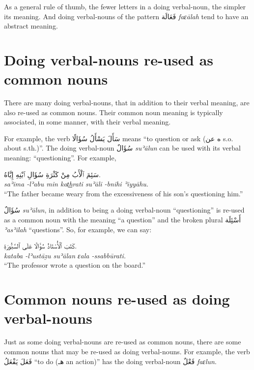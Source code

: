 \documentclass[
  10pt,
]{book}
\begin{document}
As a general rule of thumb, the fewer letters in a doing verbal-noun, the simpler its meaning. And doing verbal-nouns of the pattern \foreignlanguage{arabic}{فَعَالَة} \emph{faɛālah} tend to have an abstract meaning.

\section{Doing verbal-nouns re-used as common nouns}\label{doing-verbal-nouns-re-used-as-common-nouns}

There are many doing verbal-nouns, that in addition to their verbal meaning, are also re-used as common nouns. Their common noun meaning is typically associated, in some manner, with their verbal meaning.

For example, the verb \foreignlanguage{arabic}{سَأَلَ يَسْأَلُ سُؤَالًا} means \enquote{to question or ask (\foreignlanguage{arabic}{ه عن} s.o. about s.th.)}. The doing verbal-noun \foreignlanguage{arabic}{سُؤَالٌ} \emph{suʾālun} can be used with its verbal meaning: \enquote{questioning}. For example,

\foreignlanguage{arabic}{سَئِمَ ٱلْأَبُ مِنْ کَثْرَةِ سُؤَالِ ٱبْنِهِ إِيَّاهُ.}\\
\emph{saʾima -lʾabu min kat͟hrati suʾāli -bnihi ʾiyyāhu.}\\
\enquote{The father became weary from the excessiveness of his son's questioning him.}

\foreignlanguage{arabic}{سُؤَالٌ} \emph{suʾālun}, in addition to being a doing verbal-noun \enquote{questioning} is re-used as a common noun with the meaning \enquote{a question} and the broken plural \foreignlanguage{arabic}{أَسْئِلَة} \emph{ʾasʾilah} \enquote{questions}. So, for example, we can say:

\foreignlanguage{arabic}{کَتَبَ ٱلْأُسْتَاذُ سُؤَالًا عَلَى ٱلسَّبُّورَةِ.}\\
\emph{kataba -lʾustāẕu suʾālan ɛala -ssabbūrati.}\\
\enquote{The professor wrote a question on the board.}

\section{Common nouns re-used as doing verbal-nouns}\label{common-nouns-re-used-as-doing-verbal-nouns}

Just as some doing verbal-nouns are re-used as common nouns, there are some common nouns that may be re-used as doing verbal-nouns. For example, the verb \foreignlanguage{arabic}{فَعَلَ يَفْعَلُ} \enquote{to do (\foreignlanguage{arabic}{هـ} an action)} has the doing verbal-noun \foreignlanguage{arabic}{فَعْلٌ} \emph{faɛlun}.
\end{document}
